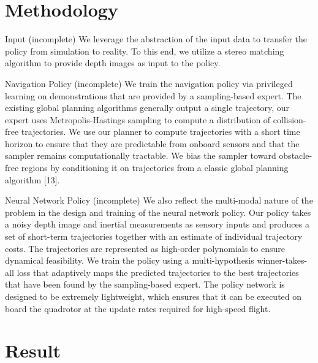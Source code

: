 \documentclass{beamer}
\begin{document}
\section{Methodology}
\begin{frame}{Input (incomplete)}
	We leverage the abstraction of the input data to transfer the policy from simulation to reality. To this end, we utilize a stereo matching algorithm \autocite{stereoMatching} to provide depth images as input to the policy. 
\end{frame}


\begin{frame}{Navigation Policy (incomplete)}
	We train the navigation policy via privileged learning \autocite{Privileged_Learning} on demonstrations that are provided by a sampling-based expert. The existing global planning algorithms \autocite{global_planning} generally output a single trajectory, our expert uses Metropolis-Hastings \autocite{MH_hasting} sampling to compute a distribution of collision-free trajectories. We use our planner to compute trajectories with a short time horizon to ensure that they are predictable from onboard sensors and that the sampler remains computationally tractable. We bias the sampler toward obstacle-free regions by conditioning it on trajectories from a classic global planning algorithm [13].
	
\end{frame}

\begin{frame}{Neural Network Policy (incomplete)}
	We also reflect the multi-modal nature of the problem in the design and training of the neural network policy. Our policy takes a noisy depth image and inertial measurements as sensory inputs and produces a set of short-term trajectories together with an estimate of individual trajectory costs. The trajectories are represented as high-order polynomials to ensure dynamical feasibility. We train the policy using a multi-hypothesis winner-takes-all loss that adaptively maps the predicted trajectories to the best trajectories that have been found by the sampling-based expert. The policy network is designed to be extremely lightweight, which ensures that it can be executed on board the quadrotor at the update rates required for high-speed flight.
	
\end{frame}

\section{Result}
\end{document}

